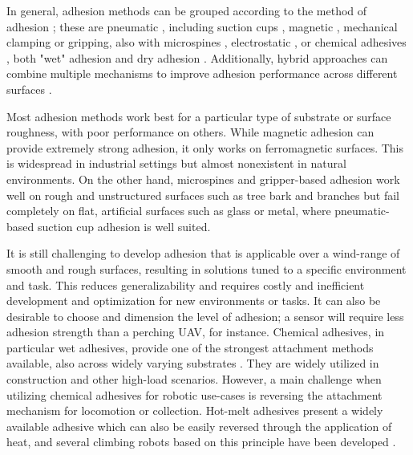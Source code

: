 

In  general, adhesion methods can be grouped according to the method of adhesion \cite{LONGO2008, Fang2023}; these are pneumatic \cite{Weston-Dawkes2021}, including suction cups \cite{Li2022, Ge2020, Yoshida2010d, Stuart2019, Liu2020}, magnetic \cite{Hong2022, Zhang2017a,Tache2009a}, mechanical clamping or gripping, also with microspines \cite{Roderick2021, SangbaeKim2005, Dynamics2008c, Askari2024,  Nguyen2019, Kirchgeorg2023a}, electrostatic \cite{Graule2016, Liu2013}, or chemical adhesives \cite{Lee2007}, both "wet" adhesion \cite{Hsiao2023,Osswald2013, Lim2024, Miyake2007} and dry adhesion \cite{Unver2006a, Kim2007, Liu2018a}. Additionally, hybrid approaches can combine multiple mechanisms to improve adhesion performance across different surfaces \cite{Bian2021, Han2021e}.
 
Most adhesion methods work best for a particular type of substrate or surface roughness, with poor performance on others. While magnetic adhesion can provide extremely strong adhesion, it only works on ferromagnetic surfaces. This is widespread in industrial settings but almost nonexistent in natural environments. On the other hand, microspines and gripper-based adhesion work well on rough and unstructured surfaces such as tree bark and branches but fail completely on flat, artificial surfaces such as glass or metal, where pneumatic-based suction cup adhesion is well suited.

It is still challenging to develop adhesion that is applicable over a wind-range of smooth and rough surfaces, resulting in solutions tuned to a specific environment and task. This reduces generalizability and requires costly and inefficient development and optimization for new environments or tasks.
It can also  be desirable to choose and dimension the level of adhesion; a sensor will require less adhesion strength than a perching UAV, for instance. Chemical adhesives, in particular wet adhesives, provide one of the strongest attachment methods available, also across widely varying substrates \cite{Huang2021}. They are widely utilized in construction and other high-load scenarios. However, a main challenge when utilizing chemical adhesives for robotic use-cases is reversing the attachment mechanism for locomotion or collection. Hot-melt adhesives present a widely available adhesive which can also be easily reversed through the application of heat, and several climbing robots based on this principle have been developed \cite{ROCHAT2011, Wang2013, Osswald2013}. 

